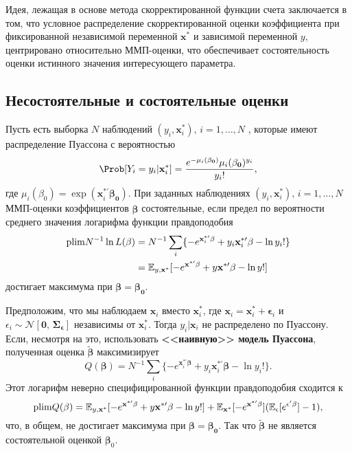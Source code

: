 Идея, лежащая в основе метода скорректированной функции счета заключается в том, что условное распределение скорректированной оценки коэффициента при фиксированной независимой переменной $\mathbf{x^*}$ и зависимой переменной $y$, центрировано относительно ММП-оценки, что обеспечивает состоятельность оценки истинного значения интересующего параметра.

\subsection*{Несостоятельные и состоятельные оценки} 
Пусть есть выборка $N$ наблюдений $(y_i, \mathbf{x}^*_i), \, i=1, \dots,N$ , которые имеют распределение Пуассона с вероятностью
\[
\Prob[Y_i=y_i|\mathbf{x}^*_i]=\frac{e^{-\mu_i(\mathbf{\beta_0})}\mu_i(\mathbf{\beta_0})^{y_i}}{y_i!},
\]
где $\mu_i(\beta_0)=\exp(\mathbf{x}^{*\prime}_i \mathbf{\beta_0})$. При заданных наблюдениях $(y_i, \mathbf{x}^*_i), \, i=1, \dots,N$ ММП-оценки коэффициентов $\mathbf{\widehat{\beta}}$ состоятельные, если предел по вероятности среднего значения логарифма функции правдоподобия
\begin{align}
\mathrm{plim } N^{-1}\ln L(\mathbf{\beta})&=N^{-1} \sum \limits_i \{ -e^{\mathbf{x}^{*\prime}_i \mathbf{\beta}} + y_i \mathbf{x}^{*\prime}_i \mathbf{\beta} - \ln y_i! \} \notag \\
&= \mathbb{E}_{y,\mathbf{x^*}}[-e^{\mathbf{x^{*\prime}} \mathbf{\beta}} + y \mathbf{x^{*\prime}} \mathbf{\beta} - \ln y! ]
\end{align}
достигает максимума при $\mathbf{\beta} = \mathbf{\beta_0}$.

Предположим, что мы наблюдаем $\mathbf{x}_i$ вместо $\mathbf{x}^*_i$, где $\mathbf{x}_i=\mathbf{x}^*_i+\mathbf{\epsilon}_i$ и $\epsilon_i \sim \mathcal{N}[\mathbf{0}, \, \mathbf{\Sigma_{\epsilon}}]$ независимы от $\mathbf{x}^*_i$. Тогда $y_i| \mathbf{x}_i$ не распределено по Пуассону. Если, несмотря на это, использовать {\bf  <<наивную>> модель Пуассона}, полученная оценка $\mathbf{\tilde{\beta}}$ максимизирует
\begin{equation}
Q(\mathbf{\beta})= N^{-1} \sum \limits_i \{ -e^{\mathbf{x}^{*\prime}_i \mathbf{\beta}} + y_i \mathbf{x}^{*\prime}_i \mathbf{\beta} - \ln y_i! \}.
\end{equation}
Этот логарифм неверно специфицированной функции правдоподобия сходится к
\begin{equation}
\mathrm{plim } Q(\mathbf{\beta})=\mathbb{E}_{y,\mathbf{x}^*}[-e^{\mathbf{x}^{*\prime} \mathbf{\beta}} + y \mathbf{x^{*\prime}} \mathbf{\beta} - \ln y! ] +  \mathbb{E}_{\mathbf{x^*}} [-e^{\mathbf{x^{*\prime}} \mathbf{\beta}}] (\mathbb{E}_{\epsilon}[e^{\mathbf{\epsilon}' \mathbf{\beta}}]-1),
\end{equation}
что, в общем, не достигает максимума при $\mathbf{\beta}= \mathbf{\beta_0}$. Так что $\mathbf{\tilde{\beta}}$ не является состоятельной оценкой $\mathbf{\beta}_0$.

